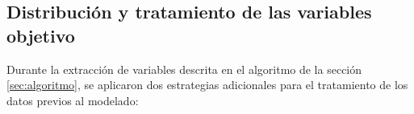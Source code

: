 
\subsection{Distribución y tratamiento de las variables objetivo}
\label{sec:distribuciones_variables_objetivo}

Durante la extracción de variables descrita en el algoritmo de la sección \ref{sec:algoritmo}, se aplicaron dos estrategias adicionales para el tratamiento de los datos previos al modelado:

